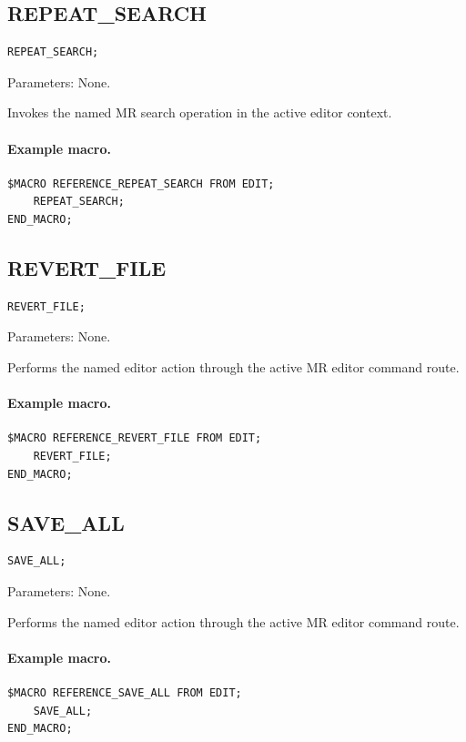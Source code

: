 \documentclass[a4paper,10pt,twoside,openany]{book}
\newenvironment{mrmacextension}{\begin{changebar}}{\end{changebar}}
\begin{document}
\begin{mrmacextension}
\label{prim:procedure-repeat-search}
\subsection*{REPEAT\_SEARCH}
\begin{verbatim}
REPEAT_SEARCH;
\end{verbatim}
Parameters: None.

Invokes the named MR search operation in the active editor context.

\paragraph{Example macro.}
\begin{verbatim}
$MACRO REFERENCE_REPEAT_SEARCH FROM EDIT;
    REPEAT_SEARCH;
END_MACRO;
\end{verbatim}
\end{mrmacextension}

\begin{mrmacextension}
\label{prim:procedure-revert-file}
\subsection*{REVERT\_FILE}
\begin{verbatim}
REVERT_FILE;
\end{verbatim}
Parameters: None.

Performs the named editor action through the active MR editor command route.

\paragraph{Example macro.}
\begin{verbatim}
$MACRO REFERENCE_REVERT_FILE FROM EDIT;
    REVERT_FILE;
END_MACRO;
\end{verbatim}
\end{mrmacextension}

\begin{mrmacextension}
\label{prim:procedure-save-all}
\subsection*{SAVE\_ALL}
\begin{verbatim}
SAVE_ALL;
\end{verbatim}
Parameters: None.

Performs the named editor action through the active MR editor command route.

\paragraph{Example macro.}
\begin{verbatim}
$MACRO REFERENCE_SAVE_ALL FROM EDIT;
    SAVE_ALL;
END_MACRO;
\end{verbatim}
\end{mrmacextension}
\end{document}
